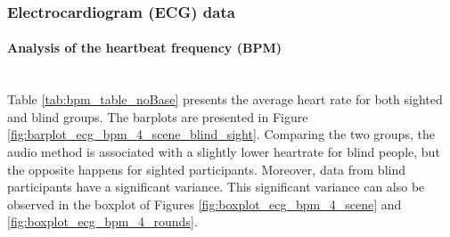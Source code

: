 \subsubsection{Electrocardiogram (ECG) data}
\label{subsubsec:results_ecg_2}

\paragraph{Analysis of the heartbeat frequency (BPM)}\mbox{}\\

Table \ref{tab:bpm_table_noBase} presents the average heart rate for both sighted and blind groups. The barplots are presented in Figure \ref{fig:barplot_ecg_bpm_4_scene_blind_sight}. Comparing the two groups, the audio method is associated with a slightly lower heartrate for blind people, but the opposite happens for sighted participants. Moreover, data from blind participants have a significant variance. This significant variance can also be observed in the boxplot of Figures \ref{fig:boxplot_ecg_bpm_4_scene} and \ref{fig:boxplot_ecg_bpm_4_rounds}. 



